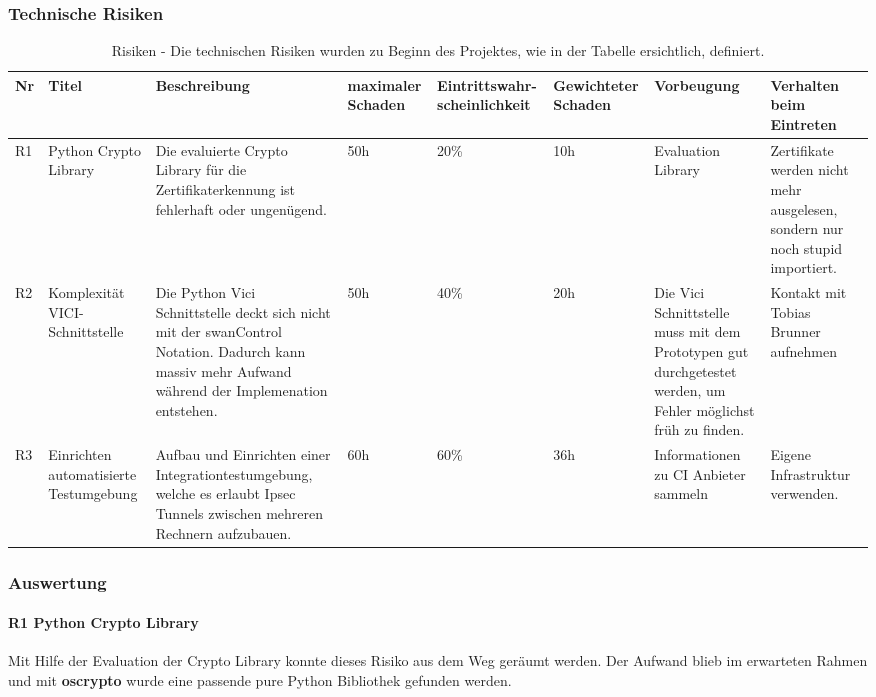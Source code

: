 \begin{landscape}
\subsubsection{Technische Risiken}
\begin{table}[H]
    \begin{tabular}{|p{0.4cm}|p{2.5cm}|p{7cm}|p{1.5cm}|p{2.25cm}|p{1.75cm}|p{3cm}|p{4cm}|}
    \hline    
    \rowcolor{lightblue}
    Nr & Titel & Beschreibung & maximaler Schaden & Eintrittswahr-scheinlichkeit & Gewichteter Schaden & Vorbeugung & Verhalten beim Eintreten \\ \hline
	R1 & Python Crypto Library & Die evaluierte Crypto Library für die Zertifikaterkennung ist fehlerhaft oder ungenügend. & 50h & 20\% & 10h & Evaluation Library & Zertifikate werden nicht mehr ausgelesen, sondern nur noch stupid importiert. \\ \hline
	R2 & Komplexität VICI-Schnittstelle & Die Python Vici Schnittstelle deckt sich nicht mit der swanControl Notation. Dadurch kann massiv mehr Aufwand während der Implemenation entstehen. & 50h & 40\% & 20h & Die Vici Schnittstelle muss mit dem Prototypen gut durchgetestet werden, um Fehler möglichst früh zu finden. & Kontakt mit Tobias Brunner aufnehmen \\ \hline
	R3 & Einrichten automatisierte Testumgebung & Aufbau und Einrichten einer Integrationtestumgebung, welche es erlaubt Ipsec Tunnels zwischen mehreren Rechnern aufzubauen. & 60h & 60\% & 36h & Informationen zu CI Anbieter sammeln & Eigene Infrastruktur verwenden. \\ \hline
    \end{tabular}
    \caption[Risiken]{Risiken - Die technischen Risiken wurden zu Beginn des Projektes, wie in der Tabelle ersichtlich, definiert.}
\end{table}
\end{landscape}

\subsubsection{Auswertung}
\paragraph{R1 Python Crypto Library} Mit Hilfe der Evaluation der Crypto Library konnte dieses Risiko aus dem Weg geräumt werden. Der Aufwand blieb im erwarteten Rahmen und mit \textbf{oscrypto} wurde eine passende pure Python Bibliothek gefunden werden.


